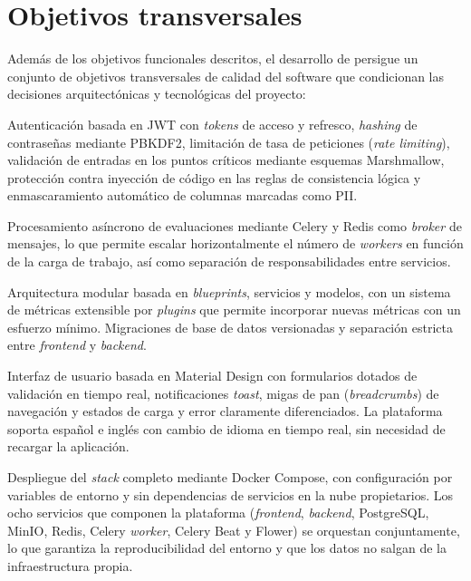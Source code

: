 \section{Objetivos transversales}
\label{sec:objetivos-transversales}

Además de los objetivos funcionales descritos, el desarrollo de \dataqual
persigue un conjunto de objetivos transversales de calidad del software que
condicionan las decisiones arquitectónicas y tecnológicas del proyecto:

\begin{definitionlist}
  \item[Seguridad]  Autenticación basada en \ac{JWT} con \emph{tokens} de
    acceso y refresco, \emph{hashing} de contraseñas mediante \ac{PBKDF2},
    limitación de tasa de peticiones (\emph{rate limiting}), validación de
    entradas en los puntos críticos mediante esquemas Marshmallow, protección
    contra inyección de código en las reglas de consistencia lógica y
    enmascaramiento automático de columnas marcadas como \ac{PII}.

  \item[Escalabilidad]  Procesamiento asíncrono de evaluaciones mediante
    Celery y Redis como \emph{broker} de mensajes, lo que permite escalar
    horizontalmente el número de \emph{workers} en función de la carga de
    trabajo, así como separación de responsabilidades entre servicios.

  \item[Mantenibilidad]  Arquitectura modular basada en \emph{blueprints},
    servicios y modelos, con un sistema de métricas extensible por
    \emph{plugins} que permite incorporar nuevas métricas con un esfuerzo
    mínimo.  Migraciones de base de datos versionadas y separación estricta
    entre \emph{frontend} y \emph{backend}.

  \item[Usabilidad]  Interfaz de usuario basada en Material Design con
    formularios dotados de validación en tiempo real, notificaciones
    \emph{toast}, migas de pan (\emph{breadcrumbs}) de navegación y estados
    de carga y error claramente diferenciados.  La plataforma soporta
    español e inglés con cambio de idioma en tiempo real, sin necesidad de
    recargar la aplicación.

  \item[Portabilidad]  Despliegue del \emph{stack} completo mediante Docker
    Compose, con configuración por variables de entorno y sin dependencias de
    servicios en la nube propietarios.  Los ocho servicios que componen la
    plataforma (\emph{frontend}, \emph{backend}, PostgreSQL, MinIO, Redis,
    Celery \emph{worker}, Celery Beat y Flower) se orquestan conjuntamente,
    lo que garantiza la reproducibilidad del entorno y que los datos no
    salgan de la infraestructura propia.
\end{definitionlist}


